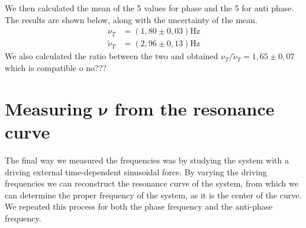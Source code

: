 \documentclass{article}
\begin{document}
We then calculated the mean of the 5 values for phase and the 5 for anti phase. The results are shown below, along with the uncertainty of the mean. 
\begin{align}
           \nu_T &= (1,80 \pm 0,03) \text{Hz} \\
    \tilde \nu_T &= (2,96 \pm 0,13) \text{Hz}
\end{align}
We also calculated the ratio between the two and obtained $ \nu_T / \tilde \nu_T = 1,65 \pm 0,07$ which is compatible o no???


\section{Measuring $ \bm \nu $ from the resonance curve}
The final way we measured the frequencies was by studying the system with a driving external time-dependent sinusoidal force. By varying the driving frequencies we can reconstruct the resonance curve of the system, from which we can determine the proper frequency of the system, as it is the center of the curve. We repeated this process for both the phase frequency and the anti-phase frequency.


\end{document}
